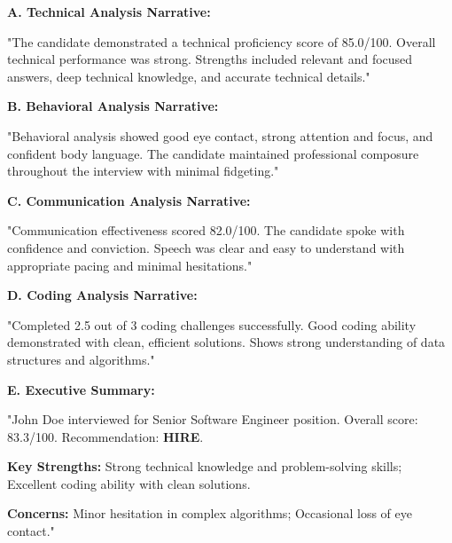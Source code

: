 \documentclass[12pt,a4paper]{article}
\begin{document}
\begin{tcolorbox}[colback=primaryblue!5,colframe=primaryblue,title=\textbf{STEP 9: Generate Narratives}]

\textbf{A. Technical Analysis Narrative:}

"The candidate demonstrated a technical proficiency score of 85.0/100. Overall technical performance was strong. Strengths included relevant and focused answers, deep technical knowledge, and accurate technical details."

\vspace{0.3cm}

\textbf{B. Behavioral Analysis Narrative:}

"Behavioral analysis showed good eye contact, strong attention and focus, and confident body language. The candidate maintained professional composure throughout the interview with minimal fidgeting."

\vspace{0.3cm}

\textbf{C. Communication Analysis Narrative:}

"Communication effectiveness scored 82.0/100. The candidate spoke with confidence and conviction. Speech was clear and easy to understand with appropriate pacing and minimal hesitations."

\vspace{0.3cm}

\textbf{D. Coding Analysis Narrative:}

"Completed 2.5 out of 3 coding challenges successfully. Good coding ability demonstrated with clean, efficient solutions. Shows strong understanding of data structures and algorithms."

\vspace{0.3cm}

\textbf{E. Executive Summary:}

"John Doe interviewed for Senior Software Engineer position. Overall score: 83.3/100. Recommendation: \textbf{HIRE}.

\textbf{Key Strengths:} Strong technical knowledge and problem-solving skills; Excellent coding ability with clean solutions.

\textbf{Concerns:} Minor hesitation in complex algorithms; Occasional loss of eye contact."

\end{tcolorbox}

\vspace{0.5cm}
\end{document}
